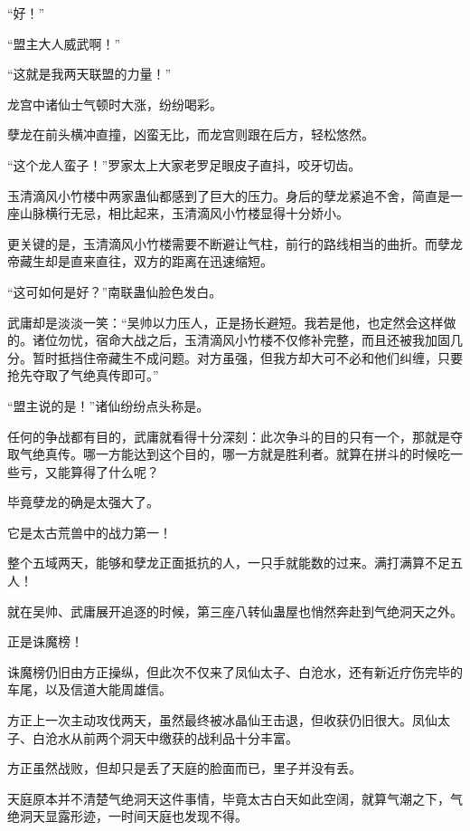 
\begin{this_body}

“好！”

“盟主大人威武啊！”

“这就是我两天联盟的力量！”

龙宫中诸仙士气顿时大涨，纷纷喝彩。

孽龙在前头横冲直撞，凶蛮无比，而龙宫则跟在后方，轻松悠然。

“这个龙人蛮子！”罗家太上大家老罗足眼皮子直抖，咬牙切齿。

玉清滴风小竹楼中两家蛊仙都感到了巨大的压力。身后的孽龙紧追不舍，简直是一座山脉横行无忌，相比起来，玉清滴风小竹楼显得十分娇小。

更关键的是，玉清滴风小竹楼需要不断避让气柱，前行的路线相当的曲折。而孽龙帝藏生却是直来直往，双方的距离在迅速缩短。

“这可如何是好？”南联蛊仙脸色发白。

武庸却是淡淡一笑：“吴帅以力压人，正是扬长避短。我若是他，也定然会这样做的。诸位勿忧，宿命大战之后，玉清滴风小竹楼不仅修补完整，而且还被我加固几分。暂时抵挡住帝藏生不成问题。对方虽强，但我方却大可不必和他们纠缠，只要抢先夺取了气绝真传即可。”

“盟主说的是！”诸仙纷纷点头称是。

任何的争战都有目的，武庸就看得十分深刻：此次争斗的目的只有一个，那就是夺取气绝真传。哪一方能达到这个目的，哪一方就是胜利者。就算在拼斗的时候吃一些亏，又能算得了什么呢？

毕竟孽龙的确是太强大了。

它是太古荒兽中的战力第一！

整个五域两天，能够和孽龙正面抵抗的人，一只手就能数的过来。满打满算不足五人！

就在吴帅、武庸展开追逐的时候，第三座八转仙蛊屋也悄然奔赴到气绝洞天之外。

正是诛魔榜！

诛魔榜仍旧由方正操纵，但此次不仅来了凤仙太子、白沧水，还有新近疗伤完毕的车尾，以及信道大能周雄信。

方正上一次主动攻伐两天，虽然最终被冰晶仙王击退，但收获仍旧很大。凤仙太子、白沧水从前两个洞天中缴获的战利品十分丰富。

方正虽然战败，但却只是丢了天庭的脸面而已，里子并没有丢。

天庭原本并不清楚气绝洞天这件事情，毕竟太古白天如此空阔，就算气潮之下，气绝洞天显露形迹，一时间天庭也发现不得。


\end{this_body}
